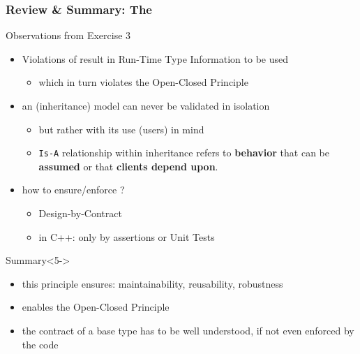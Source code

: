 \documentclass[9pt,handout]{beamer}
\begin{document}
\begin{frame}
  \frametitle{Review \& Summary: The \secname}
  \begin{block}{Observations from Exercise 3}
    \begin{itemize}
    \item<2-> Violations of {\secname} result in Run-Time Type Information to be used
      \begin{itemize}
      \item which in turn violates the Open-Closed Principle
      \end{itemize}
    \item<3-> an (inheritance) model can never be validated in isolation 
      \begin{itemize}
      \item but rather with its use (users) in mind
      \item \texttt{Is-A} relationship within inheritance refers to \textbf{behavior} that can be \textbf{assumed} or that \textbf{clients depend upon}.
      \end{itemize}
    \item<4-> how to ensure/enforce \secname?
      \begin{itemize}
      \item Design-by-Contract 
      \item in C++: only by assertions or Unit Tests
      \end{itemize}
    \end{itemize}
  \end{block}
\pause
\vfill
\begin{block}{Summary}<5->
  \begin{itemize}
  \item this principle ensures: maintainability, reusability, robustness
  \item {\secname} enables the Open-Closed Principle
  \item the contract of a base type has to be well understood, if not even enforced by the code
  \end{itemize}
\end{block}
\end{frame}
\end{document}
